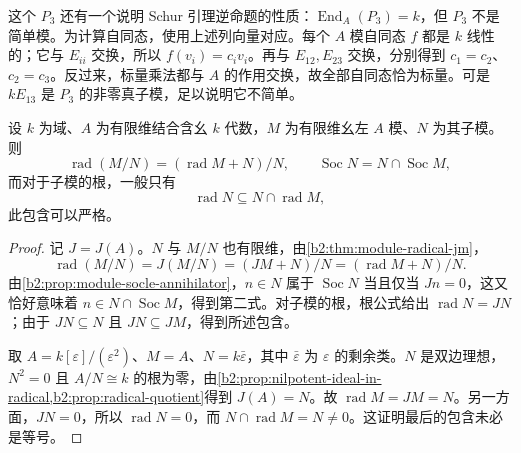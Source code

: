 \ProseParagraphBreak
这个 \(P_3\) 还有一个说明 Schur 引理逆命题的性质：\(\operatorname{End}_A(P_3)=k\)，但 \(P_3\) 不是简单模。为计算自同态，使用上述列向量对应。每个 \(A\) 模自同态 \(f\) 都是 \(k\) 线性的；它与 \(E_{ii}\) 交换，所以 \(f(v_i)=c_iv_i\)。再与 \(E_{12},E_{23}\) 交换，分别得到 \(c_1=c_2\)、\(c_2=c_3\)。反过来，标量乘法都与 \(A\) 的作用交换，故全部自同态恰为标量。可是 \(kE_{13}\) 是 \(P_3\) 的非零真子模，足以说明它不简单。

\begin{proposition}\label{b2:prop:radical-socle-subquotients}
	设 \(k\) 为域、\(A\) 为有限维结合含幺 \(k\) 代数，\(M\) 为有限维幺左 \(A\) 模、\(N\) 为其子模。则
	\[
		\operatorname{rad}(M/N)=(\operatorname{rad}M+N)/N, \qquad \operatorname{Soc}N=N\cap\operatorname{Soc}M,
	\]
	而对于子模的根，一般只有
	\[
		\operatorname{rad}N\subseteq N\cap\operatorname{rad}M,
	\]
	此包含可以严格。
\end{proposition}
\begin{proof}
	记 \(J=J(A)\)。\(N\) 与 \(M/N\) 也有限维，由\cref{b2:thm:module-radical-jm}，
	\[
		\operatorname{rad}(M/N)=J(M/N)=(JM+N)/N =(\operatorname{rad}M+N)/N.
	\]
	由\cref{b2:prop:module-socle-annihilator}，\(n\in N\) 属于 \(\operatorname{Soc}N\) 当且仅当 \(Jn=0\)，这又恰好意味着 \(n\in N\cap\operatorname{Soc}M\)，得到第二式。对子模的根，根公式给出 \(\operatorname{rad}N=JN\)；由于 \(JN\subseteq N\) 且 \(JN\subseteq JM\)，得到所述包含。

	取 \(A=k[\varepsilon]/(\varepsilon^2)\)、\(M=A\)、\(N=k\bar\varepsilon\)，其中 \(\bar\varepsilon\) 为 \(\varepsilon\) 的剩余类。\(N\) 是双边理想，\(N^2=0\) 且 \(A/N\cong k\) 的根为零，由\cref{b2:prop:nilpotent-ideal-in-radical,b2:prop:radical-quotient}得到 \(J(A)=N\)。故 \(\operatorname{rad}M=JM=N\)。另一方面，\(JN=0\)，所以 \(\operatorname{rad}N=0\)，而 \(N\cap\operatorname{rad}M=N\ne0\)。这证明最后的包含未必是等号。
\end{proof}
